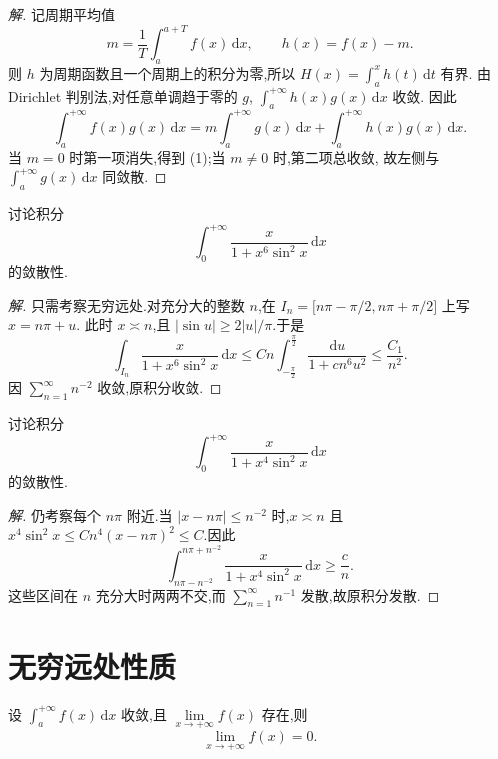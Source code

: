 \documentclass[../../数学分析培优讲义(答案版).tex]{subfiles}
\begin{document}
\begin{proof}[解]
记周期平均值
\[
    m=\dfrac{1}{T}\int_a^{a+T}f(x)\,\mathrm{d}x,
    \qquad
    h(x)=f(x)-m.
\]
则 $h$ 为周期函数且一个周期上的积分为零,所以
$\displaystyle H(x)=\int_a^xh(t)\,\mathrm{d}t$ 有界.
由 Dirichlet 判别法,对任意单调趋于零的 $g$,
$\displaystyle\int_a^{+\infty}h(x)g(x)\,\mathrm{d}x$ 收敛.
因此
\[
    \int_a^{+\infty}f(x)g(x)\,\mathrm{d}x
    =m\int_a^{+\infty}g(x)\,\mathrm{d}x
    +\int_a^{+\infty}h(x)g(x)\,\mathrm{d}x.
\]
当 $m=0$ 时第一项消失,得到 (1);当 $m\neq0$ 时,第二项总收敛,
故左侧与 $\displaystyle\int_a^{+\infty}g(x)\,\mathrm{d}x$ 同敛散.
\end{proof}

\begin{example}[\markstar]
讨论积分
\[
    \int_0^{+\infty}\dfrac{x}{1+x^6\sin^2x}\,\mathrm{d}x
\]
的敛散性.
\end{example}

\begin{proof}[解]
只需考察无穷远处.对充分大的整数 $n$,在
$I_n=\lbrack n\pi-\pi/2,n\pi+\pi/2\rbrack$ 上写 $x=n\pi+u$.
此时 $x\asymp n$,且 $|\sin u|\geq2|u|/\pi$.于是
\[
    \int_{I_n}\dfrac{x}{1+x^6\sin^2x}\,\mathrm{d}x
    \leq Cn\int_{-\frac{\pi}{2}}^{\frac{\pi}{2}}
    \dfrac{\mathrm{d}u}{1+c n^6u^2}
    \leq\dfrac{C_1}{n^2}.
\]
因 $\displaystyle\sum\limits_{n=1}^{\infty}n^{-2}$ 收敛,原积分收敛.
\end{proof}

\begin{example}[\markstar]
讨论积分
\[
    \int_0^{+\infty}\dfrac{x}{1+x^4\sin^2x}\,\mathrm{d}x
\]
的敛散性.
\end{example}

\begin{proof}[解]
仍考察每个 $n\pi$ 附近.当
$|x-n\pi|\leq n^{-2}$ 时,$x\asymp n$ 且
$x^4\sin^2x\leq Cn^4(x-n\pi)^2\leq C$.因此
\[
    \int_{n\pi-n^{-2}}^{n\pi+n^{-2}}
    \dfrac{x}{1+x^4\sin^2x}\,\mathrm{d}x
    \geq\dfrac{c}{n}.
\]
这些区间在 $n$ 充分大时两两不交,而
$\displaystyle\sum\limits_{n=1}^{\infty}n^{-1}$ 发散,故原积分发散.
\end{proof}

\newpage

\section{无穷远处性质}

\begin{example}
设 $\displaystyle\int_a^{+\infty}f(x)\,\mathrm{d}x$ 收敛,且 $\displaystyle\lim\limits_{x\to+\infty}f(x)$ 存在,则
\[
    \lim\limits_{x\to+\infty}f(x)=0.
\]
\end{example}
\end{document}
